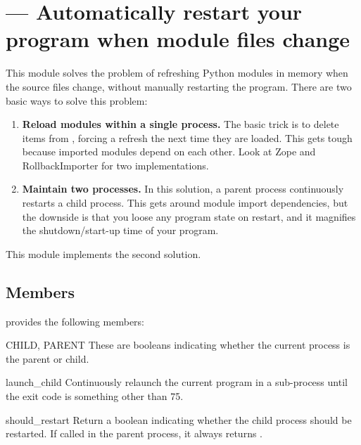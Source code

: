 \section{ ---
         Automatically restart your program when module files change}



This module solves the problem of refreshing Python modules in memory when the
source files change, without manually restarting the program. There are two
basic ways to solve this problem:

\begin{enumerate}

\item{\textbf{Reload modules within a single process.} The basic trick is to
delete items from , forcing a refresh the next time they are
loaded. This gets tough because imported modules depend on each other. Look at
Zope and RollbackImporter for two implementations.}

\item{\textbf{Maintain two processes.} In this solution, a parent process
continuously restarts a child process. This gets around module import
dependencies, but the downside is that you loose any program state on restart,
and it magnifies the shutdown/start-up time of your program.}

\end{enumerate}

This module implements the second solution.

\subsection{Members}

 provides the following members:

\begin{datadesc}{CHILD, PARENT} These are booleans indicating whether the
current process is the parent or child. \end{datadesc}

\begin{funcdesc}{launch_child}{} Continuously relaunch the current program in a
sub-process until the exit code is something other than 75. \end{funcdesc}

\begin{funcdesc}{should_restart}{} Return a boolean indicating whether the child
process should be restarted. If called in the parent process, it always returns
. \end{funcdesc}


